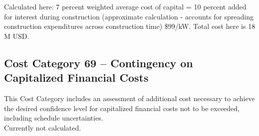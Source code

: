Calculated here: 7 percent weighted average cost of capital = 10 percent added for interest during 
construction (approximate calculation - accounts for spreading construction expenditures across construction time) \$99/kW. Total cost here is 18 M USD.

\subsection*{Cost Category 69 – Contingency on Capitalized Financial Costs}
This Cost Category includes an assessment of additional cost necessary to achieve the desired confidence level for capitalized financial costs not to be exceeded, including schedule uncertainties.\\

Currently not calculated.



